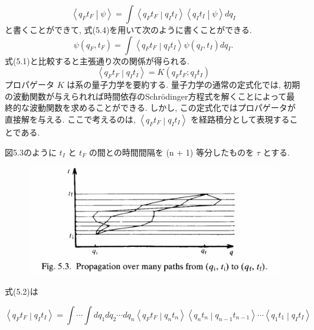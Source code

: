 \documentclass[a4paper,12pt]{article}
\newcommand{\braket}[2]{\left\langle #1\middle|#2\right\rangle}
\begin{document}
\begin{equation*}
    \braket{q_{F}t_{F}}{\psi} = \int \braket{q_{F}t_{F}}{q_{I}t_{I}}\braket{q_{I}t_{I}}{\psi}dq_{I}
\end{equation*}
と書くことができて, 式(5.4)を用いて次のように書くことができる.
\begin{equation*}
    \psi(q_{F}, t_{F}) = \int \braket{q_{F}t_{F}}{q_{I}t_{I}}\psi(q_{I}, t_{I})dq_{I}.
\end{equation*}
式(5.1)と比較すると主張通り次の関係が得られる.
\begin{equation*}
    \braket{q_{F}t_{F}}{q_{I}t_{I}} = K(q_{F}t_{F}; q_{I}t_{I}) \tag{5.5}
\end{equation*}
プロパゲータ $K$ は系の量子力学を要約する. 量子力学の通常の定式化では, 初期の波動関数が与えられれば時間依存のSchr\"{o}dinger方程式を解くことによって最終的な波動関数を求めることができる. しかし, この定式化ではプロパゲータが直接解を与える. ここで考えるのは, $\braket{q_{F}t_{F}}{q_{I}t_{I}}$ を経路積分として表現することである.\par
図5.3のように $t_{I}$ と $t_{F}$ の間との時間間隔を (n + 1) 等分したものを $\tau$ とする.

\begin{figure}[H]
    \centering
    \includegraphics[width=\textwidth]{figure/fig5-3.png}
\end{figure}

式(5.2)は

\begin{equation*}
    \braket{q_{F}t_{F}}{q_{I}t_{I}} = \int \cdots \int dq_{1}dq_{2} \cdots dq_{n} \braket{q_{F}t_{F}}{q_{n}t_{n}}\braket{q_{n}t_{n}}{q_{n-1}t_{n-1}} \cdots \braket{q_{1}t_{1}}{q_{I}t_{I}} \tag{5.6}
\end{equation*}
\end{document}
